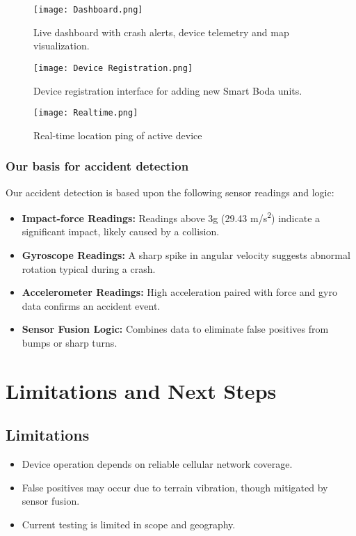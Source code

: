 \documentclass[12pt]{article}
\begin{document}
\begin{figure}[H]
  \centering
  \texttt{[image: Dashboard.png]}
  \caption{Live dashboard with crash alerts, device telemetry and map visualization.}
  \label{fig:dashboard}
\end{figure}

\begin{figure}[H]
  \centering
  \texttt{[image: Device Registration.png]}
  \caption{Device registration interface for adding new Smart Boda units.}
  \label{fig:registration}
\end{figure}

\begin{figure}[H]
  \centering
  \texttt{[image: Realtime.png]}
  \caption{Real-time location ping of active device}
  \label{fig:realtime}
\end{figure}

\subsubsection{Our basis for accident detection}
Our accident detection is based upon the following sensor readings and logic:

\begin{itemize}
  \item \textbf{Impact-force Readings:} Readings above 3g (29.43 m/s\textsuperscript{2}) indicate a significant impact, likely caused by a collision.
  \item \textbf{Gyroscope Readings:} A sharp spike in angular velocity suggests abnormal rotation typical during a crash.
  \item \textbf{Accelerometer Readings:} High acceleration paired with force and gyro data confirms an accident event.
  \item \textbf{Sensor Fusion Logic:} Combines data to eliminate false positives from bumps or sharp turns.
\end{itemize}

\section{Limitations and Next Steps}

\subsection{Limitations}
\begin{itemize}
  \item Device operation depends on reliable cellular network coverage.
  \item False positives may occur due to terrain vibration, though mitigated by sensor fusion.
  \item Current testing is limited in scope and geography.
\end{itemize}
\end{document}
